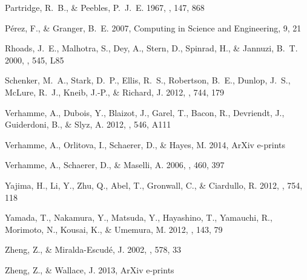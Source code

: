 \documentclass{emulateapj}
\begin{document}
\begin{thebibliography}{38}
{Partridge}, R.~B., \& {Peebles}, P.~J.~E. 1967, \apj, 147, 868

P\'erez, F., \& Granger, B.~E. 2007, Computing in Science and Engineering, 9,
  21

{Rhoads}, J.~E., {Malhotra}, S., {Dey}, A., {Stern}, D., {Spinrad}, H., \&
  {Jannuzi}, B.~T. 2000, \apjl, 545, L85

{Schenker}, M.~A., {Stark}, D.~P., {Ellis}, R.~S., {Robertson}, B.~E.,
  {Dunlop}, J.~S., {McLure}, R.~J., {Kneib}, J.-P., \& {Richard}, J. 2012,
  \apj, 744, 179

{Verhamme}, A., {Dubois}, Y., {Blaizot}, J., {Garel}, T., {Bacon}, R.,
  {Devriendt}, J., {Guiderdoni}, B., \& {Slyz}, A. 2012, \aap, 546, A111

{Verhamme}, A., {Orlitova}, I., {Schaerer}, D., \& {Hayes}, M. 2014, ArXiv
  e-prints

{Verhamme}, A., {Schaerer}, D., \& {Maselli}, A. 2006, \aap, 460, 397

{Yajima}, H., {Li}, Y., {Zhu}, Q., {Abel}, T., {Gronwall}, C., \& {Ciardullo},
  R. 2012, \apj, 754, 118

{Yamada}, T., {Nakamura}, Y., {Matsuda}, Y., {Hayashino}, T., {Yamauchi}, R.,
  {Morimoto}, N., {Kousai}, K., \& {Umemura}, M. 2012, \aj, 143, 79

{Zheng}, Z., \& {Miralda-Escud{\'e}}, J. 2002, \apj, 578, 33

{Zheng}, Z., \& {Wallace}, J. 2013, ArXiv e-prints

\end{thebibliography}
\end{document}
